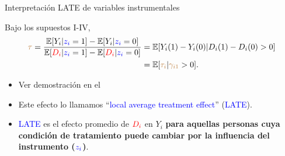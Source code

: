 \documentclass[10pt, xcolor=dvipsnames]{beamer}
\begin{document}
\begin{frame}{Interpretación LATE de variables instrumentales}\label{SLIDE:TEOR-LATE}
\begin{tcolorbox}[colback=white, title=Teorema LATE, arc=0mm,boxrule=0.5pt, breakable]
	Bajo los supuestos I-IV,
    {\small
    \begin{align*}
    \begin{split}
    \textcolor{brown}{\tau} = \frac{\operatorname{\mathbb{E}}[Y_i|\textcolor{blue}{z_i} =1] - \operatorname{\mathbb{E}}[Y_i|\textcolor{blue}{z_i} =0]}{\operatorname{\mathbb{E}}[\textcolor{red}{D_i}|\textcolor{blue}{z_i} =1] - \operatorname{\mathbb{E}}[\textcolor{red}{D_i}|\textcolor{blue}{z_i} =0]} &= \operatorname{\mathbb{E}}[Y_i(1)-Y_i(0)|D_i(1) - D_i(0) > 0] \\
    &= \operatorname{\mathbb{E}}[\textcolor{brown}{\tau_i}|\textcolor{brown}{\gamma_{i1}}>0]. 	
    \end{split}	
    \end{align*}	
}
\end{tcolorbox}
\begin{itemize}
    \item Ver demostración en el \hyperlink{ANEX:TEOR-LATE}{{}}
    \item Este efecto lo llamamos ``\textcolor{blue}{local average treatment effect}'' (\textcolor{blue}{LATE}).
    \item \textcolor{blue}{LATE} es el efecto promedio de $\textcolor{red}{D_i}$ en $Y_i$ \textbf{para aquellas personas cuya condición de tratamiento puede cambiar por la influencia del instrumento ($\textcolor{blue}{z_i}$)}.
\end{itemize}
\end{frame}
\end{document}
